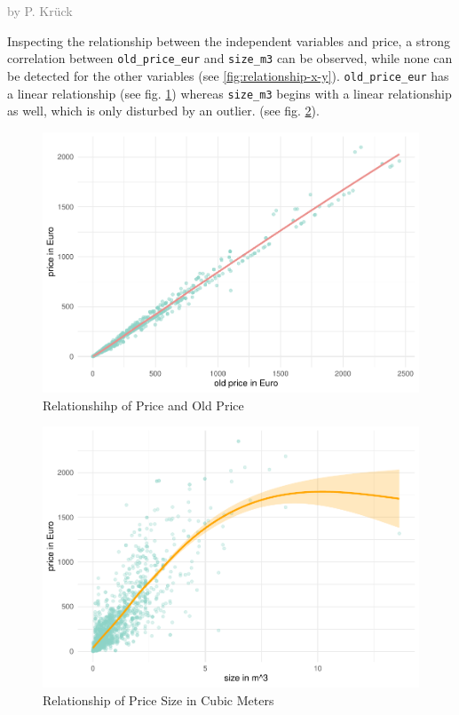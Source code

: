\documentclass[a4paper, nobind]{templates/ociamthesis}
\begin{document}
\textcolor{gray}{by P. Krück}

Inspecting the relationship between the independent variables and price, a strong correlation between \texttt{old\_price\_eur} and \texttt{size\_m3} can be observed, while none can be detected for the other variables (see \ref{fig:relationship-x-y}).
\texttt{old\_price\_eur} has a linear relationship (see fig. \ref{fig:relationship-old-price}) whereas \texttt{size\_m3} begins with a linear relationship as well, which is only disturbed by an outlier. (see fig. \ref{fig:relationship-size-m3}).

\begin{figure}
\includegraphics[width=1\linewidth]{_main_files/figure-latex/relationship-old-price-1} \caption{Relationshihp of Price and Old Price}\label{fig:relationship-old-price}
\end{figure}

\begin{figure}
\includegraphics[width=1\linewidth]{_main_files/figure-latex/relationship-size-m3-1} \caption{Relationship of Price Size in Cubic Meters}\label{fig:relationship-size-m3}
\end{figure}
\end{document}
